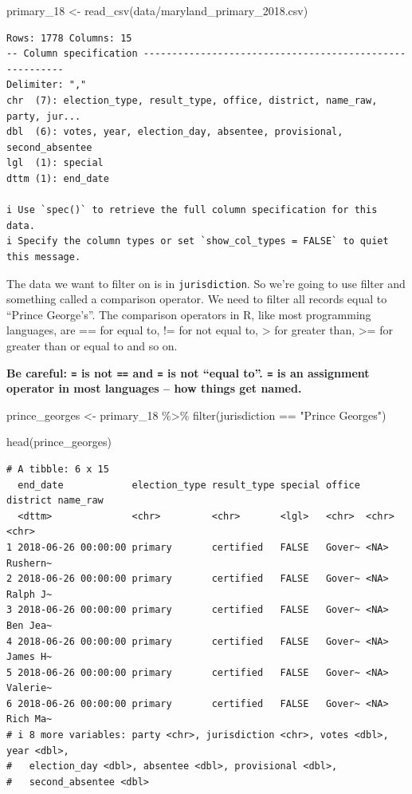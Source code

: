 \documentclass[
  letterpaper,
  DIV=11,
  numbers=noendperiod]{scrreprt}
\newenvironment{Shaded}{\begin{snugshade}}{\end{snugshade}}
\newcommand{\FunctionTok}[1]{\textcolor[rgb]{0.28,0.35,0.67}{#1}}
\newcommand{\NormalTok}[1]{\textcolor[rgb]{0.00,0.23,0.31}{#1}}
\newcommand{\OtherTok}[1]{\textcolor[rgb]{0.00,0.23,0.31}{#1}}
\newcommand{\SpecialCharTok}[1]{\textcolor[rgb]{0.37,0.37,0.37}{#1}}
\newcommand{\StringTok}[1]{\textcolor[rgb]{0.13,0.47,0.30}{#1}}
\begin{document}
\begin{Shaded}
\begin{Highlighting}[]
\NormalTok{primary\_18 }\OtherTok{\textless{}{-}} \FunctionTok{read\_csv}\NormalTok{(}\StringTok{\textquotesingle{}data/maryland\_primary\_2018.csv\textquotesingle{}}\NormalTok{)}
\end{Highlighting}
\end{Shaded}

\begin{verbatim}
Rows: 1778 Columns: 15
-- Column specification --------------------------------------------------------
Delimiter: ","
chr  (7): election_type, result_type, office, district, name_raw, party, jur...
dbl  (6): votes, year, election_day, absentee, provisional, second_absentee
lgl  (1): special
dttm (1): end_date

i Use `spec()` to retrieve the full column specification for this data.
i Specify the column types or set `show_col_types = FALSE` to quiet this message.
\end{verbatim}

The data we want to filter on is in \texttt{jurisdiction}. So we're
going to use filter and something called a comparison operator. We need
to filter all records equal to ``Prince George's''. The comparison
operators in R, like most programming languages, are == for equal to, !=
for not equal to, \textgreater{} for greater than, \textgreater= for
greater than or equal to and so on.

\textbf{Be careful: \texttt{=} is not \texttt{==} and \texttt{=} is not
``equal to''. \texttt{=} is an assignment operator in most languages --
how things get named.}

\begin{Shaded}
\begin{Highlighting}[]
\NormalTok{prince\_georges }\OtherTok{\textless{}{-}}\NormalTok{ primary\_18 }\SpecialCharTok{\%\textgreater{}\%} \FunctionTok{filter}\NormalTok{(jurisdiction }\SpecialCharTok{==} \StringTok{"Prince George\textquotesingle{}s"}\NormalTok{)}

\FunctionTok{head}\NormalTok{(prince\_georges)}
\end{Highlighting}
\end{Shaded}

\begin{verbatim}
# A tibble: 6 x 15
  end_date            election_type result_type special office district name_raw
  <dttm>              <chr>         <chr>       <lgl>   <chr>  <chr>    <chr>   
1 2018-06-26 00:00:00 primary       certified   FALSE   Gover~ <NA>     Rushern~
2 2018-06-26 00:00:00 primary       certified   FALSE   Gover~ <NA>     Ralph J~
3 2018-06-26 00:00:00 primary       certified   FALSE   Gover~ <NA>     Ben Jea~
4 2018-06-26 00:00:00 primary       certified   FALSE   Gover~ <NA>     James H~
5 2018-06-26 00:00:00 primary       certified   FALSE   Gover~ <NA>     Valerie~
6 2018-06-26 00:00:00 primary       certified   FALSE   Gover~ <NA>     Rich Ma~
# i 8 more variables: party <chr>, jurisdiction <chr>, votes <dbl>, year <dbl>,
#   election_day <dbl>, absentee <dbl>, provisional <dbl>,
#   second_absentee <dbl>
\end{verbatim}
\end{document}
